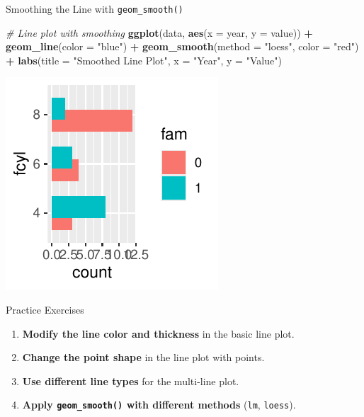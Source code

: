 \documentclass[
  ignorenonframetext,
]{beamer}
\newenvironment{Shaded}{\begin{snugshade}}{\end{snugshade}}
\newcommand{\AttributeTok}[1]{\textcolor[rgb]{0.13,0.29,0.53}{#1}}
\newcommand{\CommentTok}[1]{\textcolor[rgb]{0.56,0.35,0.01}{\textit{#1}}}
\newcommand{\FunctionTok}[1]{\textcolor[rgb]{0.13,0.29,0.53}{\textbf{#1}}}
\newcommand{\NormalTok}[1]{#1}
\newcommand{\SpecialCharTok}[1]{\textcolor[rgb]{0.81,0.36,0.00}{\textbf{#1}}}
\newcommand{\StringTok}[1]{\textcolor[rgb]{0.31,0.60,0.02}{#1}}
\providecommand{\tightlist}{%
  \setlength{\itemsep}{0pt}\setlength{\parskip}{0pt}}
\begin{document}
\begin{frame}[fragile]{Smoothing the Line with \texttt{geom\_smooth()}}
\label{smoothing-the-line-with-geom_smooth}

\begin{Shaded}
\begin{Highlighting}[]
\CommentTok{\# Line plot with smoothing}
\FunctionTok{ggplot}\NormalTok{(data, }\FunctionTok{aes}\NormalTok{(}\AttributeTok{x =}\NormalTok{ year, }\AttributeTok{y =}\NormalTok{ value)) }\SpecialCharTok{+} \FunctionTok{geom\_line}\NormalTok{(}\AttributeTok{color =} \StringTok{"blue"}\NormalTok{) }\SpecialCharTok{+}
    \FunctionTok{geom\_smooth}\NormalTok{(}\AttributeTok{method =} \StringTok{"loess"}\NormalTok{, }\AttributeTok{color =} \StringTok{"red"}\NormalTok{) }\SpecialCharTok{+} \FunctionTok{labs}\NormalTok{(}\AttributeTok{title =} \StringTok{"Smoothed Line Plot"}\NormalTok{,}
    \AttributeTok{x =} \StringTok{"Year"}\NormalTok{, }\AttributeTok{y =} \StringTok{"Value"}\NormalTok{)}
\end{Highlighting}
\end{Shaded}

\begin{center}\includegraphics[width=0.5\linewidth]{Figs/unnamed-chunk-61-1} \end{center}
\end{frame}

\begin{frame}[fragile]{Practice Exercises}
\label{practice-exercises}
\begin{enumerate}
\tightlist
\item
  \textbf{Modify the line color and thickness} in the basic line plot.
\item
  \textbf{Change the point shape} in the line plot with points.
\item
  \textbf{Use different line types} for the multi-line plot.
\item
  \textbf{Apply \texttt{geom\_smooth()} with different methods}
  (\texttt{lm}, \texttt{loess}).
\end{enumerate}
\end{frame}
\end{document}
